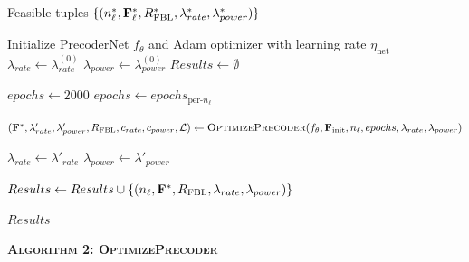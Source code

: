\documentclass[a4paper, 12pt, onecolumn, journal, twoside, draftclsnofoot]{IEEEtran}
\begin{document}
\begin{algorithmic}[1]

\Ensure
Feasible tuples
$\{(n_\ell^*, {\bf F}_\ell^*, R_{\mathrm{FBL}}^*,
\lambda_{rate}^*, \lambda_{power}^*)\}$

\State Initialize PrecoderNet $f_\theta$ and Adam optimizer with learning rate $\eta_{\text{net}}$
\State $\lambda_{rate} \gets \lambda_{rate}^{(0)}$
\State $\lambda_{power} \gets \lambda_{power}^{(0)}$
\State $Results \gets \emptyset$


        \State $epochs \gets 2000$ 
    \Else
        \State $epochs \gets epochs_{\text{per-}n_\ell}$
    \EndIf

    \State
    $({\bf F}^*,
    \lambda'_{rate},
    \lambda'_{power},
    R_{\mathrm{FBL}},
    c_{rate},
    c_{power},
    \mathcal{L})
    \gets
    \textsc{OptimizePrecoder}(f_\theta,
    {\bf F}_{\mathrm{init}},
    n_\ell,
    epochs,
    \lambda_{rate},
    \lambda_{power})$

    \State $\lambda_{rate} \gets \lambda'_{rate}$
    \State $\lambda_{power} \gets \lambda'_{power}$


        \State
        $Results \gets Results \cup
        \{(n_\ell, {\bf F}^*, R_{\mathrm{FBL}},
        \lambda_{rate}, \lambda_{power})\}$
    \EndIf

\EndFor
\State \Return $Results$
\end{algorithmic}

\newpage

\noindent\textbf{\textsc{Algorithm 2: OptimizePrecoder}}
\end{document}
